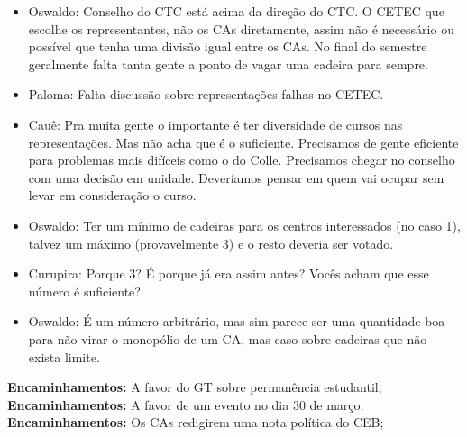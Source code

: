 \documentclass{ata-calico}
\begin{document}
\begin{itemize}

    \item Oswaldo: Conselho do CTC está acima da direção do CTC. O CETEC que escolhe os representantes, não os CAs diretamente, assim não é necessário ou possível que tenha uma divisão igual entre os CAs. No final do semestre geralmente falta tanta gente a ponto de vagar uma cadeira para sempre.

    \item Paloma: Falta discussão sobre representações falhas no CETEC.
    
    \item Cauê: Pra muita gente o importante é ter diversidade de cursos nas representações. Mas não acha que é o suficiente. Precisamos de gente eficiente para problemas mais difíceis como o do Colle. Precisamos chegar no conselho com uma decisão em unidade. Deveríamos pensar em quem vai ocupar sem levar em consideração o curso.
    
    \item Oswaldo: Ter um mínimo de cadeiras para os centros interessados (no caso 1), talvez um máximo (provavelmente 3) e o resto deveria ser votado.
    
    \item Curupira: Porque 3? É porque já era assim antes? Vocês acham que esse número é suficiente?
    
    \item Oswaldo: É um número arbitrário, mas sim parece ser uma quantidade boa para não virar o monopólio de um CA, mas caso sobre cadeiras que não exista limite.

\end{itemize}

\textbf{Encaminhamentos:} A favor do GT sobre permanência estudantil;\\

\textbf{Encaminhamentos:} A favor de um evento no dia 30 de março;\\

\textbf{Encaminhamentos:} Os CAs redigirem uma nota política do CEB;\\

\end{document}
